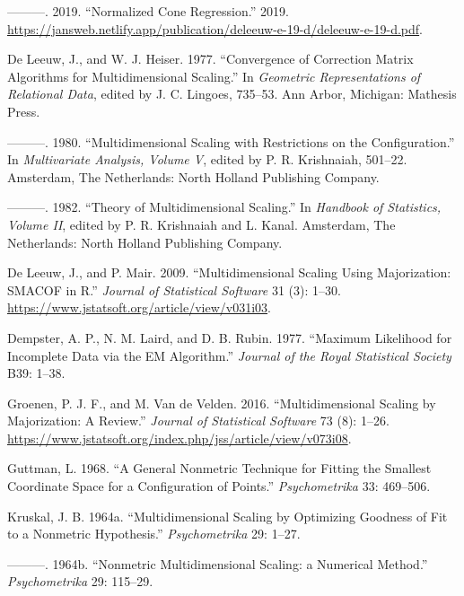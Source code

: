 \documentclass[
  12pt,
  letterpaper,
  DIV=11,
  numbers=noendperiod]{scrartcl}
\newlength{\cslhangindent}
\newenvironment{CSLReferences}[2] %
 {\begin{list}{}{%
  \setlength{\itemindent}{0pt}
  \setlength{\leftmargin}{0pt}
  \setlength{\parsep}{0pt}
  \ifodd #1
   \setlength{\leftmargin}{\cslhangindent}
   \setlength{\itemindent}{-1\cslhangindent}
  \fi
  \setlength{\itemsep}{#2\baselineskip}}}
 {\end{list}}
\theoremstyle{plain}
\theoremstyle{remark}
\begin{document}
\begin{CSLReferences}{1}{0}
---------. 2019. {``Normalized Cone Regression.''} 2019.
\url{https://jansweb.netlify.app/publication/deleeuw-e-19-d/deleeuw-e-19-d.pdf}.

De Leeuw, J., and W. J. Heiser. 1977. {``Convergence of Correction
Matrix Algorithms for Multidimensional Scaling.''} In \emph{Geometric
Representations of Relational Data}, edited by J. C. Lingoes, 735--53.
Ann Arbor, Michigan: Mathesis Press.

---------. 1980. {``Multidimensional Scaling with Restrictions on the
Configuration.''} In \emph{Multivariate Analysis, Volume {V}}, edited by
P. R. Krishnaiah, 501--22. Amsterdam, The Netherlands: North Holland
Publishing Company.

---------. 1982. {``Theory of Multidimensional Scaling.''} In
\emph{Handbook of Statistics, Volume {II}}, edited by P. R. Krishnaiah
and L. Kanal. Amsterdam, The Netherlands: North Holland Publishing
Company.

De Leeuw, J., and P. Mair. 2009. {``{Multidimensional Scaling Using
Majorization: SMACOF in R}.''} \emph{Journal of Statistical Software} 31
(3): 1--30. \url{https://www.jstatsoft.org/article/view/v031i03}.

Dempster, A. P., N. M. Laird, and D. B. Rubin. 1977. {``{Maximum
Likelihood for Incomplete Data via the EM Algorithm}.''} \emph{Journal
of the Royal Statistical Society} B39: 1--38.

Groenen, P. J. F., and M. Van de Velden. 2016. {``{Multidimensional
Scaling by Majorization: A Review}.''} \emph{Journal of Statistical
Software} 73 (8): 1--26.
\url{https://www.jstatsoft.org/index.php/jss/article/view/v073i08}.

Guttman, L. 1968. {``{A General Nonmetric Technique for Fitting the
Smallest Coordinate Space for a Configuration of Points}.''}
\emph{Psychometrika} 33: 469--506.

Kruskal, J. B. 1964a. {``{Multidimensional Scaling by Optimizing
Goodness of Fit to a Nonmetric Hypothesis}.''} \emph{Psychometrika} 29:
1--27.

---------. 1964b. {``{Nonmetric Multidimensional Scaling: a Numerical
Method}.''} \emph{Psychometrika} 29: 115--29.


\end{CSLReferences}
\end{document}
